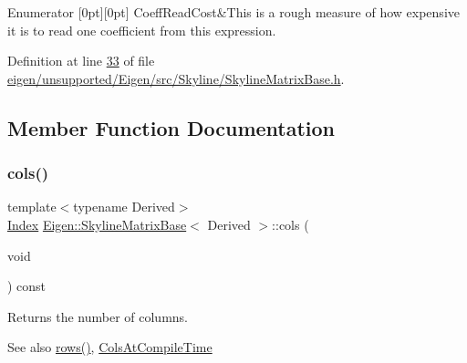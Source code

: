 \begin{DoxyEnumFields}{Enumerator}
[0pt][0pt]{}\mbox{\label{class_eigen_1_1_skyline_matrix_base_a811ba3961cb927ae5fa84ed278ebceeaa2f2f2c74314a961757ff965e3b7df794}} 
Coeff\+Read\+Cost&This is a rough measure of how expensive it is to read one coefficient from this expression. \\
\hline

\end{DoxyEnumFields}


Definition at line \hyperlink{eigen_2unsupported_2_eigen_2src_2_skyline_2_skyline_matrix_base_8h_source_l00033}{33} of file \hyperlink{eigen_2unsupported_2_eigen_2src_2_skyline_2_skyline_matrix_base_8h_source}{eigen/unsupported/\+Eigen/src/\+Skyline/\+Skyline\+Matrix\+Base.\+h}.



\subsection{Member Function Documentation}
\mbox{\label{class_eigen_1_1_skyline_matrix_base_aff9cfadb45ffbae8a33b710bc9b49d71}} 
\subsubsection{\texorpdfstring{cols()}{cols()}\hspace{0.1cm}{\footnotesize\ttfamily [1/2]}}
{\footnotesize\ttfamily template$<$typename Derived$>$ \\
\hyperlink{group___core___module_a554f30542cc2316add4b1ea0a492ff02}{Index} \hyperlink{class_eigen_1_1_skyline_matrix_base}{Eigen\+::\+Skyline\+Matrix\+Base}$<$ Derived $>$\+::cols (\begin{DoxyParamCaption}\item[{void}]{ }\end{DoxyParamCaption}) const\hspace{0.3cm}{\ttfamily [inline]}}

\begin{DoxyReturn}{Returns}
the number of columns. 
\end{DoxyReturn}
\begin{DoxySeeAlso}{See also}
\hyperlink{class_eigen_1_1_skyline_matrix_base_a8243b2fe6bcc6c3037717fcb0afa9d46}{rows()}, \hyperlink{class_eigen_1_1_skyline_matrix_base_a811ba3961cb927ae5fa84ed278ebceeaa0bb8b9ae248b86ca53aff754311111e8}{Cols\+At\+Compile\+Time} 
\end{DoxySeeAlso}


